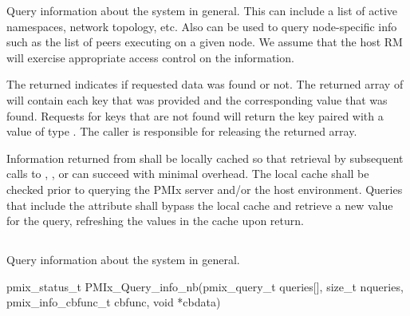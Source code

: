 \optattrend

\descr

Query information about the system in general.
This can include a list of active namespaces, network topology, etc.
Also can be used to query node-specific info such as the list of peers executing on a given node.
We assume that the host \ac{RM} will exercise appropriate access control on the information.

The returned  indicates if requested data was found or not.
The returned array of  will contain each key that was provided and the corresponding value that was found. Requests for keys that are not found will return the key paired with a value of type . The caller is responsible for releasing the returned array.

\adviceimplstart
Information returned from  shall be locally cached so that retrieval by subsequent calls to , , or  can succeed with minimal overhead. The local cache shall be checked prior to querying the \ac{PMIx} server and/or the host environment. Queries that include the  attribute shall bypass the local cache and retrieve a new value for the query, refreshing the values in the cache upon return.
\adviceimplend

\subsection{}

\summary

Query information about the system in general.

\format

\cspecificstart
\begin{codepar}
pmix_status_t
PMIx_Query_info_nb(pmix_query_t queries[], size_t nqueries,
                   pmix_info_cbfunc_t cbfunc, void *cbdata)
\end{codepar}
\cspecificend

\begin{arglist}
\end{arglist}


